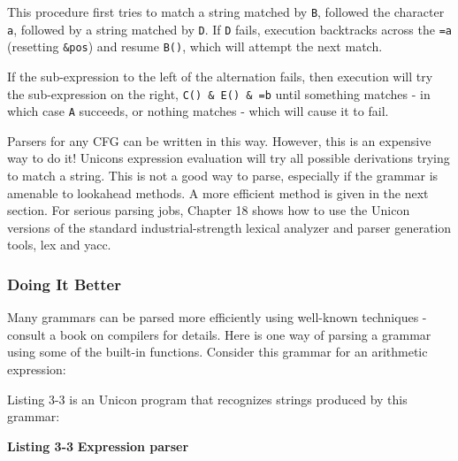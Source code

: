 \noindent
This procedure first tries to match a string matched by \texttt{B},
followed the character \texttt{a}, followed by a string matched by
\texttt{D}. If \texttt{D} fails, execution
backtracks across the \texttt{={\textquotedbl}a{\textquotedbl}}
(resetting \texttt{\&pos}) and resume \texttt{B()}, which will attempt
the next match.

If the sub-expression to the left of the alternation fails, then execution will try the
sub-expression on the right, \texttt{C() \& E() \&
={\textquotedbl}b{\textquotedbl}} until something matches - in which
case \texttt{A} succeeds, or nothing matches - which will cause it to
fail.

Parsers for any CFG can be written in this way. However, this is an
expensive way to do it! Unicon{\textquotesingle}s
expression evaluation will try all possible derivations
trying to match a string. This is not a good way to parse, especially
if the grammar is amenable to lookahead methods. A more efficient
method is given in the next section. For serious parsing jobs, Chapter
18 shows how to use the Unicon versions of the standard
industrial-strength lexical analyzer and parser generation tools, lex
and yacc.

\subsubsection[Doing It Better]{Doing It Better}

Many grammars can be parsed more efficiently using
well-known techniques - consult a book on compilers for details. Here
is one way of parsing a grammar using some of the built-in
functions. Consider this grammar for an arithmetic expression:


\noindent
Listing 3-3 is an Unicon program that recognizes strings produced by
this grammar:

\bigskip

{\sffamily\bfseries Listing 3-3}
{\sffamily\bfseries Expression parser}

